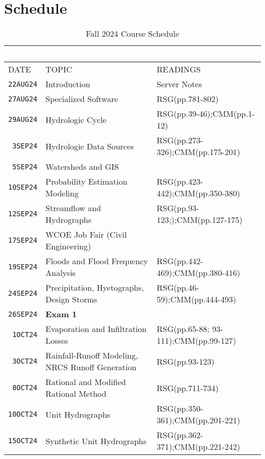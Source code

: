 \documentclass[12pt]{article}
\begin{document}
\section*{Schedule}
\begin{table}[ht!]
   \centering
   \caption{Fall 2024 Course Schedule}
   \begin{tabular}{p{0.5in}p{3.0in}p{3.0in}} 
   ~ & ~ & ~  \\
\hline
DATE & TOPIC & READINGS  \\
\hline
\texttt{22AUG24} & Introduction & Server Notes  \\ %
\texttt{27AUG24} & Specialized Software & RSG(pp.781-802) \\ %
\texttt{29AUG24} & Hydrologic Cycle  & RSG(pp.39-46);CMM(pp.1-12)\\ %
\texttt{~3SEP24} & Hydrologic Data Sources & RSG(pp.273-326);CMM(pp.175-201)\\ %
\texttt{~5SEP24} & Watersheds and GIS &  \\ %
\texttt{10SEP24} & Probability Estimation Modeling &  RSG(pp.423-442);CMM(pp.350-380)\\ %
\texttt{12SEP24} & Streamflow and Hydrographs & RSG(pp.93-123;);CMM(pp.127-175)\\ %
\texttt{17SEP24} & WCOE Job Fair (Civil Engineering)   &   \\ %
\texttt{19SEP24} & Floods and Flood Frequency Analysis & RSG(pp.442-469);CMM(pp.380-416) \\ %
\texttt{24SEP24} & Precipitation, Hyetographs, Design Storms &  RSG(pp.46-59);CMM(pp.444-493) \\  %
\texttt{26SEP24} & \textbf{Exam 1} &  \\ %
\texttt{~1OCT24} & Evaporation and Infiltration Losses & RSG(pp.65-88; 93-111);CMM(pp.99-127) \\ %
\texttt{~3OCT24} & Rainfall-Runoff Modeling, NRCS Runoff Generation & RSG(pp.93-123) \\ %
\texttt{~8OCT24} & Rational and Modified Rational Method & RSG(pp.711-734) \\  %
\texttt{10OCT24} & Unit Hydrographs & RSG(pp.350-361);CMM(pp.201-221)\\ %
\texttt{15OCT24} & Synthetic Unit Hydrographs & RSG(pp.362-371);CMM(pp.221-242) \\ %

\end{tabular}
\end{table}
\end{document}
